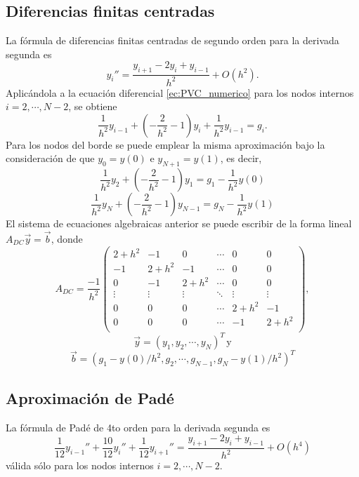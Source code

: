 \documentclass[aps,prb,twocolumn,superscriptaddress,floatfix,longbibliography]{revtex4-2}
\newif\ifptitle
\newif\ifpnumber
\newcounter{para}
\newcommand\ptitle[1]{\par\refstepcounter{para}
{\ifpnumber{\noindent\textcolor{lightgray}{\textbf{\thepara}}\indent}\fi}
{\ifptitle{\textbf{[{#1}]}}\fi}}
\begin{document}
\subsection{Diferencias finitas centradas}
La fórmula de diferencias finitas centradas de segundo orden para la derivada segunda es \cite{Moin}
\begin{equation}
    y_i'' = \frac{y_{i+1} - 2 y_i + y_{i-1}}{h^2} + O(h^2).
    \label{ec:diferencias_centradas}
\end{equation}
Aplicándola a la ecuación diferencial \ref{ec:PVC_numerico} para los nodos internos $i = 2, \cdots, N-2$, se obtiene
\[ \frac{1}{h^2} y_{i-1} + \left (-\frac{2}{h^2} - 1 \right ) y_i + \frac{1}{h^2} y_{i-1} = g_i.\]
Para los nodos del borde se puede emplear la misma aproximación bajo la consideración de que $y_0 = y(0)$ e $y_{N+1} = y(1)$, es decir,
\[\frac{1}{h^2}y_2 + \left (-\frac{2}{h^2} - 1 \right ) y_1 = g_1 - \frac{1}{h^2}y(0)  \]
\[\frac{1}{h^2}y_N + \left (-\frac{2}{h^2} - 1 \right ) y_{N-1} = g_N - \frac{1}{h^2}y(1)  \]
El sistema de ecuaciones algebraicas anterior se puede escribir de la forma lineal $A_{DC} \vec{y} = \vec{b}$, donde
\[
    A_{DC} = \frac{-1}{h^2}\left(\begin{matrix}
        2 + h^2 & -1 & 0 & \cdots & 0 & 0\\
        -1 & 2 + h^2 & -1 & \cdots & 0 & 0\\
        0 & -1 & 2 + h^2 & \cdots & 0 & 0\\
        \vdots & \vdots & \vdots & \ddots & \vdots & \vdots\\
        0 & 0 & 0 & \cdots & 2 + h^2 & -1\\
        0 & 0 & 0 & \cdots & -1 & 2 + h^2\\
        \end{matrix}\right),
\]
\[\vec{y} = (y_1, y_2, \cdots, y_N)^T \, \mathrm{y}\]
\[\vec{b} = (g_1 - y(0)/h^2, g_2, \cdots, g_{N-1}, g_N -  y(1)/h^2)^T\]




\subsection{Aproximación de Padé}

\ptitle{Obtención del sistema lineal en los nodos internos}
La fórmula de Padé de 4to orden para la derivada segunda es \cite{Moin}
\begin{equation}
    \frac{1}{12} y_{i-1}'' + \frac{10}{12} y_i'' + \frac{1}{12} y_{i+1}'' = \frac{y_{i+1} - 2 y_i + y_{i-1}}{h^2} + O(h^4)
    \label{ec:Pade_interior}
\end{equation}
válida sólo para los nodos internos $i = 2, \cdots, N-2$.
\end{document}
